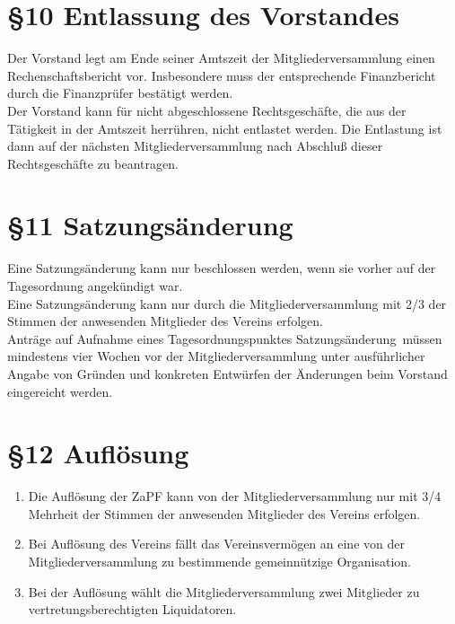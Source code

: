 \documentclass[ngerman]{article}
\begin{document}
\section*{§10 Entlassung des Vorstandes}
Der Vorstand legt am Ende seiner Amtszeit der Mitgliederversammlung einen Rechenschaftsbericht vor. Insbesondere muss der entsprechende Finanzbericht durch die Finanzprüfer bestätigt werden.\\
Der Vorstand kann für nicht abgeschlossene Rechtsgeschäfte, die aus der Tätigkeit in der Amtszeit herrühren, nicht entlastet werden. Die Entlastung ist dann auf der nächsten Mitgliederversammlung nach
Abschluß dieser Rechtsgeschäfte zu beantragen.


\section*{§11 Satzungsänderung}
Eine Satzungsänderung kann nur beschlossen werden, wenn sie vorher auf der Tagesordnung angekündigt war.\\
Eine Satzungsänderung kann nur durch die Mitgliederversammlung mit 2/3 der Stimmen der anwesenden Mitglieder des Vereins erfolgen.\\
Anträge auf Aufnahme eines Tagesordnungspunktes \glqq Satzungsänderung\grqq\ müssen mindestens vier Wochen vor der Mitgliederversammlung unter ausführlicher Angabe von Gründen und konkreten Entwürfen der Änderungen beim Vorstand eingereicht werden.


\section*{§12 Auflösung}
\begin{enumerate}
 \item Die Auflösung der ZaPF kann von der Mitgliederversammlung nur mit 3/4 Mehrheit der Stimmen der anwesenden Mitglieder des Vereins erfolgen.
 \item Bei Auflösung des Vereins fällt das Vereinsvermögen an eine von der Mitgliederversammlung zu bestimmende gemeinnützige Organisation.
 \item Bei der Auflösung wählt die Mitgliederversammlung zwei Mitglieder zu vertretungsberechtigten Liquidatoren.
\end{enumerate}
\end{document}
